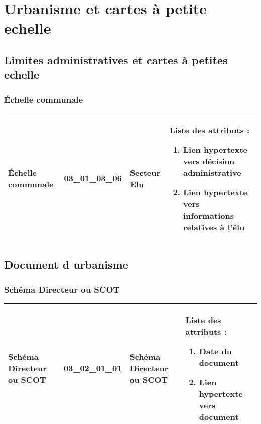 \documentclass[12pt,titlepage]{book}
\begin{document}
\chapter{Urbanisme et cartes à petite echelle}
\section{\large Limites administratives et cartes à petites echelle}
\subsection{Échelle communale}
\noindent
\vspace{\baselineskip}

\renewcommand{\arraystretch}{1.2}
\begin{supertabular}{|p{10cm}|c|p{13cm}|p{12cm}|}
 Échelle communale & 03\_01\_03\_06 & Secteur Elu & Liste des attributs :
\begin{enumerate}
  \item Lien hypertexte vers décision administrative  \item Lien hypertexte vers informations relatives à l'élu\end{enumerate}
\\
\hline
\end{supertabular}
\begin{figure}[h!]
  \hfill         %
\end{figure}

\section{\large Document d urbanisme}
\subsection{Schéma Directeur ou SCOT}
\noindent
\vspace{\baselineskip}

\renewcommand{\arraystretch}{1.2}
\begin{supertabular}{|p{10cm}|c|p{13cm}|p{12cm}|}
 Schéma Directeur ou SCOT & 03\_02\_01\_01 & Schéma Directeur ou SCOT & Liste des attributs :
\begin{enumerate}
  \item Date du document  \item Lien hypertexte vers document\end{enumerate}
\\
\hline
\end{supertabular}
\begin{figure}[h!]
  \hfill         %
\end{figure}
\end{document}
